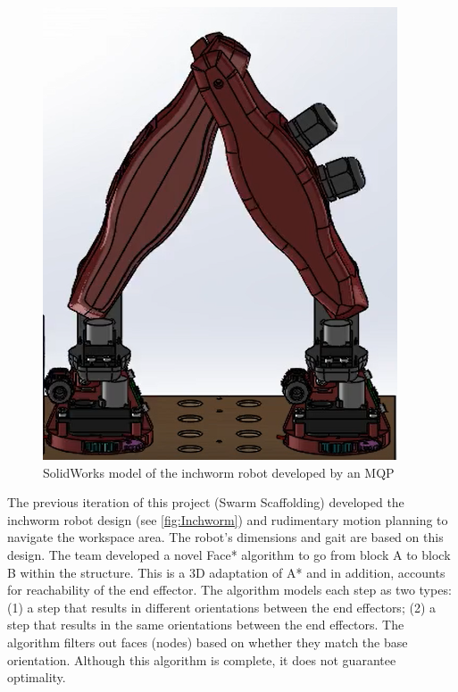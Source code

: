 \begin{figure}[ht]
    \includegraphics[width=\linewidth]{figures/InchwormPic.PNG}
    \caption{SolidWorks model of the inchworm robot developed by an MQP \cite{PastMQP}}
    \label{fig:Inchworm}
\end{figure} 

The previous iteration of this project (Swarm Scaffolding) developed the inchworm robot design (see \autoref{fig:Inchworm}) and rudimentary motion planning to navigate the workspace area. The robot’s dimensions and gait are based on this design. The team developed a novel Face* algorithm to go from block A to block B within the structure. This is a 3D adaptation of A* and in addition, accounts for reachability of the end effector. The algorithm models each step as two types: (1) a step that results in different orientations between the end effectors; (2) a step that results in the same orientations between the end effectors. The algorithm filters out faces (nodes) based on whether they match the base orientation. Although this algorithm is complete, it does not guarantee optimality\cite{PastMQP}.

